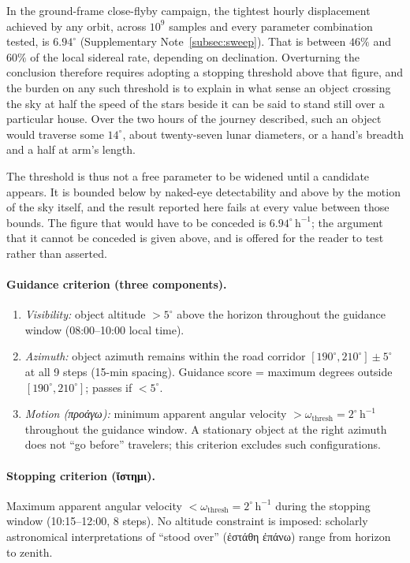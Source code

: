 \documentclass[11pt,a4paper]{article}
\newcommand{\grk}[1]{{\fontencoding{LGR}\selectfont #1}}
\newcommand{\grk}[1]{{\greekfont #1}}
\begin{document}
In the ground-frame close-flyby campaign, the tightest hourly displacement
achieved by any orbit, across $10^9$ samples and every parameter combination
tested, is $6.94^\circ$ (Supplementary Note~\ref{subsec:sweep}). That
is between $46\%$ and $60\%$ of the local sidereal rate, depending on
declination. Overturning the conclusion therefore requires adopting a stopping
threshold above that figure, and the burden on any such threshold is to explain
in what sense an object crossing the sky at half the speed of the stars beside
it can be said to stand still over a particular house. Over the two hours of
the journey described, such an object would traverse some $14^\circ$, about
twenty-seven lunar diameters, or a hand's breadth and a half at arm's length.

The threshold is thus not a free parameter to be widened until a candidate
appears. It is bounded below by naked-eye detectability and above by the motion
of the sky itself, and the result reported here fails at every value between
those bounds. The figure that would have to be conceded is
$6.94^\circ\,\mathrm{h}^{-1}$; the argument that it cannot be conceded is given
above, and is offered for the reader to test rather than asserted.

\paragraph{Guidance criterion (three components).}
\begin{enumerate}
  \item \textit{Visibility:} object altitude $> 5^\circ$ above the horizon
    throughout the guidance window (08:00--10:00 local time).
  \item \textit{Azimuth:} object azimuth remains within the road corridor
    $[190^\circ, 210^\circ] \pm 5^\circ$ at all 9 steps (15-min spacing).
    Guidance score = maximum degrees outside $[190^\circ, 210^\circ]$;
    passes if $< 5^\circ$.
  \item \textit{Motion (\grk{προάγω}):} minimum apparent angular velocity
    $> \omega_\mathrm{thresh} = 2^\circ\,\mathrm{h}^{-1}$ throughout the
    guidance window. A stationary object at the right azimuth does not
    ``go before'' travelers; this criterion excludes such configurations.
\end{enumerate}

\paragraph{Stopping criterion (\grk{ἵστημι}).}
Maximum apparent angular velocity $< \omega_\mathrm{thresh} =
2^\circ\,\mathrm{h}^{-1}$ during the stopping window (10:15--12:00, 8 steps).
No altitude constraint is imposed: scholarly astronomical interpretations of
``stood over'' (\grk{ἐστάθη ἐπάνω}) range from horizon to zenith.
\end{document}
